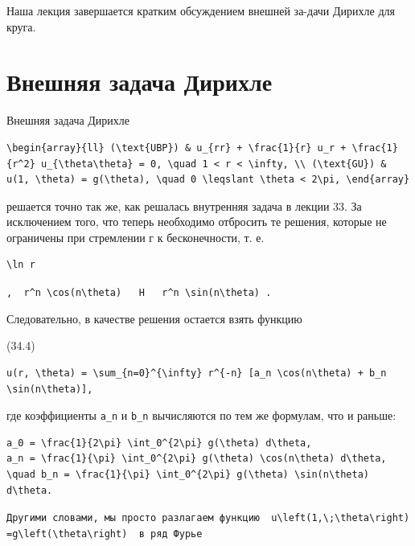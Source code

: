 \documentclass[
  ukrainian,
]{article}
\begin{document}
Наша лекция завершается кратким обсуждением внешней за-дачи Дирихле для
круга.

\section{Внешняя задача
Дирихле}\label{ux432ux43dux435ux448ux43dux44fux44f-ux437ux430ux434ux430ux447ux430-ux434ux438ux440ux438ux445ux43bux435}

Внешняя задача Дирихле

\begin{verbatim}
\begin{array}{ll} (\text{UBP}) & u_{rr} + \frac{1}{r} u_r + \frac{1}{r^2} u_{\theta\theta} = 0, \quad 1 < r < \infty, \\ (\text{GU}) & u(1, \theta) = g(\theta), \quad 0 \leqslant \theta < 2\pi, \end{array}
\end{verbatim}

решается точно так же, как решалась внутренняя задача в лекции 33. За
исключением того, что теперь необходимо отбросить те решения, которые не
ограничены при стремлении г к бесконечности, т. е.

\begin{verbatim}
\ln r
\end{verbatim}

\texttt{,\ \ \textquotesingle{}r\^{}n\ \textbackslash{}cos(n\textbackslash{}theta)\textquotesingle{}\ \ \ \textquotesingle{}H\textquotesingle{}\ \ \ \textquotesingle{}r\^{}n\ \textbackslash{}sin(n\textbackslash{}theta)\textquotesingle{}\ .}

Следовательно, в качестве решения остается взять функцию

(34.4)

\begin{verbatim}
u(r, \theta) = \sum_{n=0}^{\infty} r^{-n} [a_n \cos(n\theta) + b_n \sin(n\theta)],
\end{verbatim}

где коэффициенты \texttt{a\_n} и \texttt{b\_n} вычисляются по тем же
формулам, что и раньше:

\begin{verbatim}
a_0 = \frac{1}{2\pi} \int_0^{2\pi} g(\theta) d\theta,
a_n = \frac{1}{\pi} \int_0^{2\pi} g(\theta) \cos(n\theta) d\theta, \quad b_n = \frac{1}{\pi} \int_0^{2\pi} g(\theta) \sin(n\theta) d\theta.
\end{verbatim}

\texttt{Другими\ словами,\ мы\ просто\ разлагаем\ функцию\ \ \textquotesingle{}u\textbackslash{}left(1,\textbackslash{};\textbackslash{}theta\textbackslash{}right)=g\textbackslash{}left(\textbackslash{}theta\textbackslash{}right)\textquotesingle{}\ \ в\ ряд\ Фурье}
\end{document}
